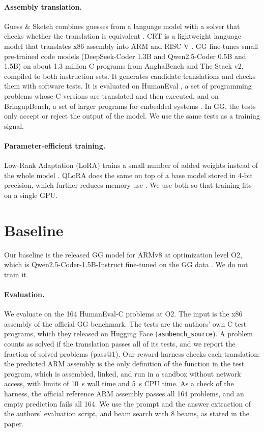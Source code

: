 \documentclass{article}
\begin{document}
\paragraph{Assembly translation.}
Guess \& Sketch combines guesses from a language model with a solver that checks whether the translation is equivalent \citep{guesssketch}. CRT is a lightweight language model that translates x86 assembly into ARM and RISC-V \citep{crt}. GG fine-tunes small pre-trained code models (DeepSeek-Coder 1.3B and Qwen2.5-Coder 0.5B and 1.5B) on about 1.3 million C programs from AnghaBench and The Stack v2, compiled to both instruction sets. It generates candidate translations and checks them with software tests. It is evaluated on HumanEval \citep{humaneval}, a set of programming problems whose C versions are translated and then executed, and on BringupBench, a set of larger programs for embedded systems \citep{gg}. In GG, the tests only accept or reject the output of the model. We use the same tests as a training signal.

\paragraph{Parameter-efficient training.}
Low-Rank Adaptation (LoRA) trains a small number of added weights instead of the whole model \citep{lora}. QLoRA does the same on top of a base model stored in 4-bit precision, which further reduces memory use \citep{qlora}. We use both so that training fits on a single GPU.

\section{Baseline}
\label{sec:baseline}

Our baseline is the released GG model for ARMv8 at optimization level O2, which is Qwen2.5-Coder-1.5B-Instruct fine-tuned on the GG data \citep{gg}. We do not train it.

\paragraph{Evaluation.}
We evaluate on the 164 HumanEval-C problems at O2. The input is the x86 assembly of the official GG benchmark. The tests are the authors' own C test programs, which they released on Hugging Face (\texttt{asmbench\_source}). A problem counts as solved if the translation passes all of its tests, and we report the fraction of solved problems (pass@1). Our reward harness checks each translation: the predicted ARM assembly is the only definition of the function in the test program, which is assembled, linked, and run in a sandbox without network access, with limits of 10~s wall time and 5~s CPU time. As a check of the harness, the official reference ARM assembly passes all 164 problems, and an empty prediction fails all 164. We use the prompt and the answer extraction of the authors' evaluation script, and beam search with 8 beams, as stated in the paper.
\end{document}
